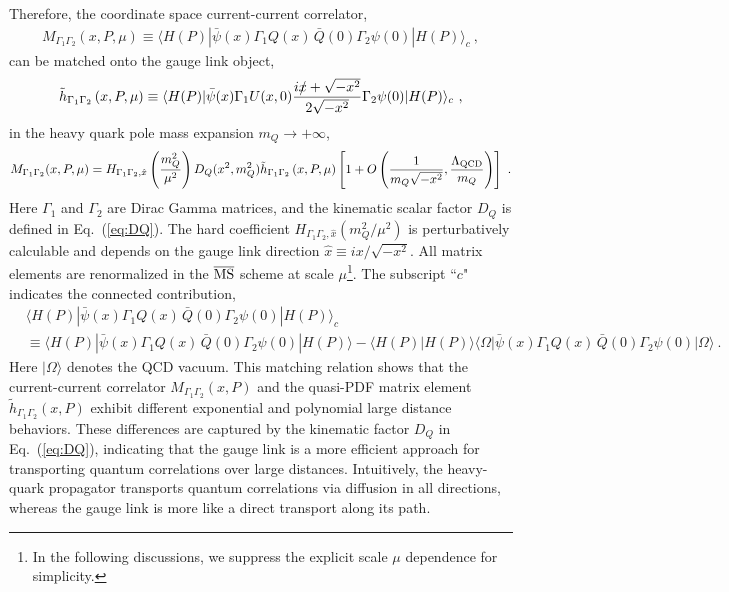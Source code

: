 \documentclass[a4paper,11pt]{article}
\begin{document}
Therefore, the coordinate space current-current correlator,
\begin{align}\label{eq:MqQQq}
M_{\Gamma_1\Gamma_2}(x,P,\mu) \equiv  \langle H(P) | \bar{\psi}(x) \Gamma_1 Q(x) \, \bar{Q}(0) \Gamma_2 \psi(0) | H(P) \rangle_c \ ,   
\end{align}
can be matched onto the gauge link object,
\begin{align}\label{eq:hqUq}
\tilde{h}_{\Gamma_1\Gamma_2}\left(x,P,\mu\right) \equiv   \langle H(P) | \bar{\psi}(x) \Gamma_1 U(x,0) \frac{i \slashed{x} + \sqrt{-x^2}}{2 \sqrt{-x^2}} \Gamma_2 \psi(0) | H(P) \rangle_c  \ ,
\end{align}
in the heavy quark pole mass expansion $m_{Q} \rightarrow +\infty$, 
\begin{align}\label{eq:MatQGL}
M_{\Gamma_1\Gamma_2}(x,P,\mu) = H_{\Gamma_1\Gamma_2,\hat{x}}\left(\frac{m_{Q}^2} {\mu^2}\right) D_{Q}(x^2,m_{Q}^2) \tilde{h}_{\Gamma_1\Gamma_2}\left(x,P,\mu\right) \left[ 1 + O\left( \frac{1}{m_{Q} \sqrt{-x^2}}, \frac{\Lambda_{\rm QCD}}{m_{Q}} \right) \right] \ .
\end{align}
Here $\Gamma_1$ and $\Gamma_2$ are Dirac Gamma matrices, and the kinematic scalar factor $D_Q$ is defined in Eq.~(\ref{eq:DQ}). The hard coefficient $H_{\Gamma_1\Gamma_2,\hat{x}}\left(m_{Q}^2/\mu^2\right)$ is perturbatively calculable and depends on the gauge link direction $\hat{x} \equiv i x/\sqrt{-x^2}$. All matrix elements are renormalized in the $\overline{\rm MS}$ scheme at scale $\mu$\footnote{In the following discussions, we suppress the explicit scale $\mu$ dependence for simplicity.}. The subscript ``$c$" indicates the connected contribution,
\begin{align}\label{eq:connected}
&\langle H(P) | \bar{\psi}(x) \Gamma_1 Q(x) \, \bar{Q}(0) \Gamma_2 \psi(0) | H(P) \rangle_c \nonumber\\
&\equiv \langle H(P) | \bar{\psi}(x) \Gamma_1 Q(x) \, \bar{Q}(0) \Gamma_2 \psi(0) | H(P) \rangle
- \langle H(P) | H(P) \rangle \langle \Omega | \bar{\psi}(x) \Gamma_1 Q(x) \, \bar{Q}(0) \Gamma_2 \psi(0) | \Omega \rangle \ .
\end{align}
Here $| \Omega \rangle$ denotes the QCD vacuum. This matching relation shows that the current-current correlator $M_{\Gamma_1\Gamma_2}(x,P)$ and the quasi-PDF matrix element $\tilde{h}_{\Gamma_1\Gamma_2}(x,P)$ exhibit different exponential and polynomial large distance behaviors. These differences are captured by the kinematic factor $D_Q$ in Eq.~(\ref{eq:DQ}), indicating that the gauge link is a more efficient approach for transporting quantum correlations over large distances. Intuitively, the heavy-quark propagator transports quantum correlations via diffusion in all directions, whereas the gauge link is more like a direct transport along its path. 
\end{document}
